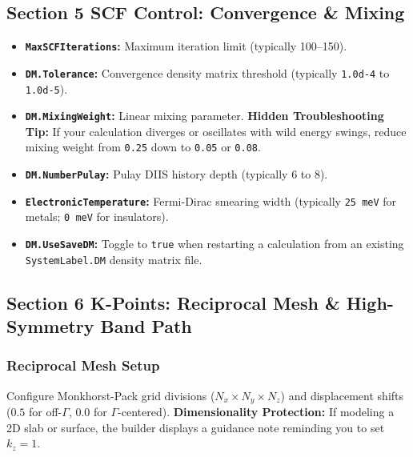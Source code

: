 \documentclass[11pt,a4paper]{article}
\begin{document}
\subsection{Section 5 SCF Control: Convergence \& Mixing}
\begin{itemize}[leftmargin=*]
 \item \textbf{\texttt{MaxSCFIterations}:} Maximum iteration limit (typically 100–150).
 \item \textbf{\texttt{DM.Tolerance}:} Convergence density matrix threshold (typically \texttt{1.0d-4} to \texttt{1.0d-5}).
 \item \textbf{\texttt{DM.MixingWeight}:} Linear mixing parameter. \textbf{Hidden Troubleshooting Tip:} If your calculation diverges or oscillates with wild energy swings, reduce mixing weight from \texttt{0.25} down to \texttt{0.05} or \texttt{0.08}.
 \item \textbf{\texttt{DM.NumberPulay}:} Pulay DIIS history depth (typically 6 to 8).
 \item \textbf{\texttt{ElectronicTemperature}:} Fermi-Dirac smearing width (typically \texttt{25 meV} for metals; \texttt{0 meV} for insulators).
 \item \textbf{\texttt{DM.UseSaveDM}:} Toggle to \texttt{true} when restarting a calculation from an existing \texttt{SystemLabel.DM} density matrix file.
\end{itemize}

\subsection{Section 6 K-Points: Reciprocal Mesh \& High-Symmetry Band Path}

\subsubsection{Reciprocal Mesh Setup}
Configure Monkhorst-Pack grid divisions ($N_x \times N_y \times N_z$) and displacement shifts ($0.5$ for off-$\Gamma$, $0.0$ for $\Gamma$-centered).
\textbf{Dimensionality Protection:} If modeling a 2D slab or surface, the builder displays a guidance note reminding you to set $k_z = 1$.
\end{document}
